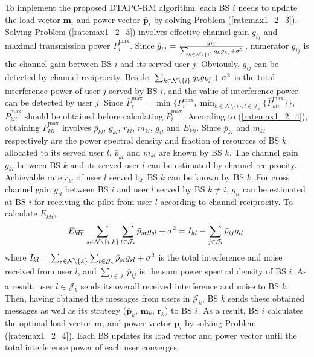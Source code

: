 \documentclass[journal]{IEEEtran}
\begin{document}
To implement the proposed DTAPC-RM algorithm, each BS $i$ needs to update the load vector $\pmb m_i$ and power vector $\pmb {\bar p}_i$ by solving Problem (\ref{ratemax1_2_3}).
Solving Problem (\ref{ratemax1_2_3}) involves effective channel gain $\bar g_{ij}$ and maximal transmission power $\bar P_i^{\max}$.
Since  $\bar g_{ij}=\frac{g_{ij}}{{\sum_{k \in {\cal{N}}\setminus \{i\}}  q_k g_{kj} +\sigma ^2}}$,
numerator $g_{ij}$ is the channel gain between BS $i$ and its served user $j$.
Obviously, $g_{ij}$ can be detected by channel reciprocity.
Beside,
${\sum_{k \in {\cal{N}}\setminus \{i\}}  q_k g_{kj} +\sigma ^2}$ is the total interference power of user $j$ served by BS $i$, and the value of interference power can be detected by user $j$.
Since $\bar P_i^{\max}=\min\{P_i^{\max},\min_{k \in \mathcal N\setminus \{i\}, l \in  \mathcal J_k} \{\bar P_{kli}^{\max}\}\}$, $\bar P_{kli}^{\max}$ should be obtained before calculating $\bar P_i^{\max}$.
According to (\ref{ratemax1_2_4}), obtaining $\bar P_{kli}^{\max}$ involves $\bar p_{kl}$, $g_{kl}$, $r_{kl}$, $m_{kl}$, $g_{il}$ and $E_{kli}$.
Since $\bar p_{kl}$ and $m_{kl}$ respectively are the power spectral density and fraction of resources of BS $k$ allocated to its served user $l$, $\bar p_{kl}$ and $m_{kl}$ are known by BS $k$.
The channel gain $g_{kl}$ between BS $k$ and its served user $l$ can be estimated by channel reciprocity.
Achievable rate $r_{kl}$ of user $l$ served by BS $k$ can be known by BS $k$.
For cross channel gain $g_{il}$ between BS $i$ and user $l$ served by BS $k\neq i$, $g_{il}$ can be estimated at BS $i$ for receiving the pilot from user $l$ according to channel reciprocity.
To calculate $E_{kli}$,
\begin{eqnarray}
E_{kli}&&\!\!\!\!\!\!\!\!\!\!
=\sum_{s \in {\cal{N}}\setminus \{i,k\}} \sum_{t \in {\cal{J}}_s} \bar p_{st} g_{sl} +\sigma ^2
=I_{kl}-\sum_{j \in \mathcal J_i}\bar p_{ij} g_{il}, \nonumber
\end{eqnarray}
where $I_{kl}=\sum_{s \in {\cal{N}}\setminus \{k\}} \sum_{t \in {\cal{J}}_s} \bar p_{st} g_{sl} +\sigma ^2$ is the total interference and noise received from user $l$, and $\sum_{j \in \mathcal J_i}\bar p_{ij}$ is the sum power spectral density of BS $i$.
As a result, user $l\in \mathcal J_k$ sends its overall received interference and noise to BS $k$.
Then, having obtained the messages from users in $\mathcal J_k$, BS $k$ sends these obtained messages as well as its strategy ($\pmb{\bar p}_{k}$, $\pmb m_{k}$, $\pmb r_{k}$) to BS $i$.
As a result, BS $i$ calculates the optimal load vector $\pmb m_i$ and power vector $\pmb {\bar p}_i$ by solving Problem (\ref{ratemax1_2_4}).
Each BS updates its load vector and power vector until the total interference power of each user converges.
\end{document}
